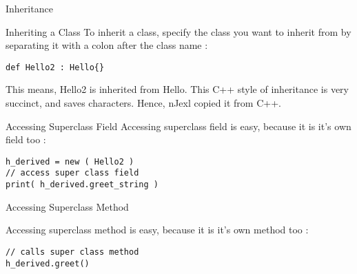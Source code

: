 \begin{section}{Inheritance}

\begin{subsection}{Inheriting a Class}
To inherit a class, specify the class you 
want to inherit from by separating it with a colon 
after the class name :

\begin{center}\begin{minipage}{\linewidth}
\begin{lstlisting}[style=JexlStyle]
def Hello2 : Hello{}
\end{lstlisting}  
\end{minipage}\end{center}

This means, Hello2 is inherited from Hello.
This C++ style of inheritance is very succinct, and saves characters.
Hence, nJexl copied it from C++.

\end{subsection}

\begin{subsection}{Accessing Superclass Field}
Accessing superclass field is easy, because it is 
it's own field too :

\begin{center}\begin{minipage}{\linewidth}
\begin{lstlisting}[style=JexlStyle]
h_derived = new ( Hello2 )
// access super class field
print( h_derived.greet_string )
\end{lstlisting}  
\end{minipage}\end{center}
\end{subsection}

\begin{subsection}{Accessing Superclass Method}

Accessing superclass method is easy, because it is 
it's own method too :

\begin{center}\begin{minipage}{\linewidth}
\begin{lstlisting}[style=JexlStyle]
// calls super class method 
h_derived.greet()
\end{lstlisting}  
\end{minipage}\end{center}
\end{subsection}


\end{section}
